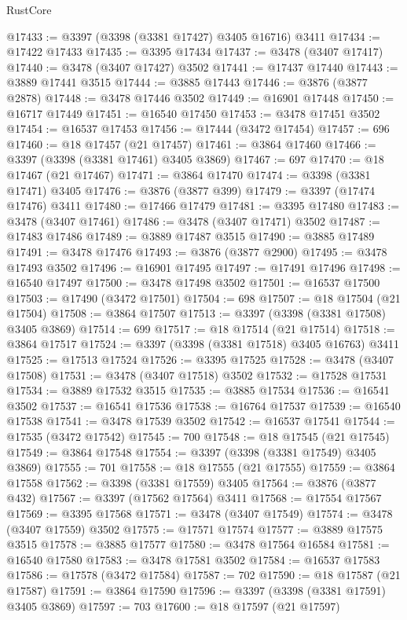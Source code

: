 \begin{lexlean}{RustCore}
\begin{coremodule}
@17433 := @3397 (@3398 (@3381 @17427) @3405 @16716) @3411
@17434 := @17422 @17433
@17435 := @3395 @17434
@17437 := @3478 (@3407 @17417)
@17440 := @3478 (@3407 @17427) @3502
@17441 := @17437 @17440
@17443 := @3889 @17441 @3515
@17444 := @3885 @17443
@17446 := @3876 (@3877 @2878)
@17448 := @3478 @17446 @3502
@17449 := @16901 @17448
@17450 := @16717 @17449
@17451 := @16540 @17450
@17453 := @3478 @17451 @3502
@17454 := @16537 @17453
@17456 := @17444 (@3472 @17454)
@17457 := 696
@17460 := @18 @17457 (@21 @17457)
@17461 := @3864 @17460
@17466 := @3397 (@3398 (@3381 @17461) @3405 @3869)
@17467 := 697
@17470 := @18 @17467 (@21 @17467)
@17471 := @3864 @17470
@17474 := @3398 (@3381 @17471) @3405
@17476 := @3876 (@3877 @399)
@17479 := @3397 (@17474 @17476) @3411
@17480 := @17466 @17479
@17481 := @3395 @17480
@17483 := @3478 (@3407 @17461)
@17486 := @3478 (@3407 @17471) @3502
@17487 := @17483 @17486
@17489 := @3889 @17487 @3515
@17490 := @3885 @17489
@17491 := @3478 @17476
@17493 := @3876 (@3877 @2900)
@17495 := @3478 @17493 @3502
@17496 := @16901 @17495
@17497 := @17491 @17496
@17498 := @16540 @17497
@17500 := @3478 @17498 @3502
@17501 := @16537 @17500
@17503 := @17490 (@3472 @17501)
@17504 := 698
@17507 := @18 @17504 (@21 @17504)
@17508 := @3864 @17507
@17513 := @3397 (@3398 (@3381 @17508) @3405 @3869)
@17514 := 699
@17517 := @18 @17514 (@21 @17514)
@17518 := @3864 @17517
@17524 := @3397 (@3398 (@3381 @17518) @3405 @16763) @3411
@17525 := @17513 @17524
@17526 := @3395 @17525
@17528 := @3478 (@3407 @17508)
@17531 := @3478 (@3407 @17518) @3502
@17532 := @17528 @17531
@17534 := @3889 @17532 @3515
@17535 := @3885 @17534
@17536 := @16541 @3502
@17537 := @16541 @17536
@17538 := @16764 @17537
@17539 := @16540 @17538
@17541 := @3478 @17539 @3502
@17542 := @16537 @17541
@17544 := @17535 (@3472 @17542)
@17545 := 700
@17548 := @18 @17545 (@21 @17545)
@17549 := @3864 @17548
@17554 := @3397 (@3398 (@3381 @17549) @3405 @3869)
@17555 := 701
@17558 := @18 @17555 (@21 @17555)
@17559 := @3864 @17558
@17562 := @3398 (@3381 @17559) @3405
@17564 := @3876 (@3877 @432)
@17567 := @3397 (@17562 @17564) @3411
@17568 := @17554 @17567
@17569 := @3395 @17568
@17571 := @3478 (@3407 @17549)
@17574 := @3478 (@3407 @17559) @3502
@17575 := @17571 @17574
@17577 := @3889 @17575 @3515
@17578 := @3885 @17577
@17580 := @3478 @17564 @16584
@17581 := @16540 @17580
@17583 := @3478 @17581 @3502
@17584 := @16537 @17583
@17586 := @17578 (@3472 @17584)
@17587 := 702
@17590 := @18 @17587 (@21 @17587)
@17591 := @3864 @17590
@17596 := @3397 (@3398 (@3381 @17591) @3405 @3869)
@17597 := 703
@17600 := @18 @17597 (@21 @17597)

\end{coremodule}
\end{lexlean}
